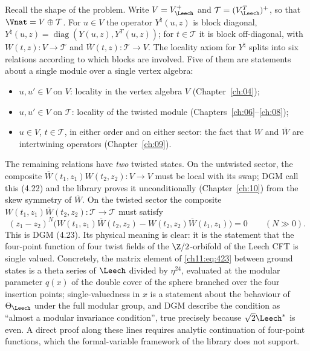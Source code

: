 Recall the shape of the problem.  Write $V=V_\Leech^+$ and $\mathcal T=(V_\Leech^T)^+$, so that
$\Vnat=V\oplus\mathcal T$.  For $u\in V$ the operator $Y^\natural(u,z)$ is block diagonal,
$Y^\natural(u,z)=\operatorname{diag}(Y(u,z),Y^T(u,z))$; for $t\in\mathcal T$ it is block
off-diagonal, with $W(t,z):V\to\mathcal T$ and $\overline W(t,z):\mathcal T\to V$.  The locality
axiom for $Y^\natural$ splits into six relations according to which blocks are involved.  Five of
them are statements about a single module over a single vertex algebra:
\begin{itemize}
  \item $u,u'\in V$ on $V$: locality in the vertex algebra $V$ (Chapter~\ref{ch:04});
  \item $u,u'\in V$ on $\mathcal T$: locality of the twisted module (Chapters~\ref{ch:06}--\ref{ch:08});
  \item $u\in V$, $t\in\mathcal T$, in either order and on either sector: the fact that $W$ and
  $\overline W$ are intertwining operators (Chapter~\ref{ch:09}).
\end{itemize}
The remaining relations have \emph{two} twisted states.  On the untwisted sector, the composite
$\overline W(t_1,z_1)W(t_2,z_2):V\to V$ must be local with its swap; DGM call this (4.22) and the
library proves it unconditionally (Chapter~\ref{ch:10}) from the skew symmetry of $\overline W$.
On the twisted sector the composite $W(t_1,z_1)\overline W(t_2,z_2):\mathcal T\to\mathcal T$ must
satisfy
\begin{equation}\label{ch11:eq:423}
  (z_1-z_2)^N\Big(W(t_1,z_1)\overline W(t_2,z_2)-W(t_2,z_2)\overline W(t_1,z_1)\Big)=0
  \qquad(N\gg0).
\end{equation}
This is DGM (4.23).  Its physical meaning is clear: it is the statement that the four-point
function of four twist fields of the $\Z/2$-orbifold of the Leech CFT is single valued.
Concretely, the matrix element of \eqref{ch11:eq:423} between ground states is a theta series of
$\Leech$ divided by $\eta^{24}$, evaluated at the modular parameter $q(x)$ of the double cover of
the sphere branched over the four insertion points; single-valuedness in $x$ is a statement about
the behaviour of $\Theta_\Leech$ under the full modular group, and DGM describe the condition as
``almost a modular invariance condition'', true precisely because $\sqrt2\Leech^*$ is even.  A
direct proof along these lines requires analytic continuation of four-point functions, which the
formal-variable framework of the library does not support.

